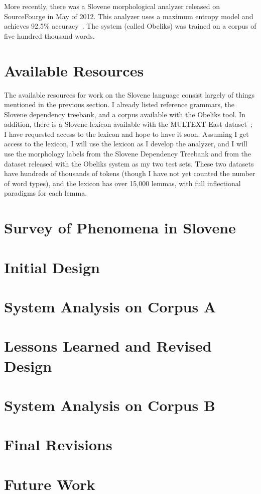 \documentclass[11pt,letterpaper]{article}
\begin{document}
More recently, there was a Slovene morphological analyzer released on
SourceFourge in May of 2012.  This analyzer uses a maximum entropy model and
achieves 92.5\% accuracy~\citep{grcar-2012-obeliks}.  The system (called
Obeliks) was trained on a corpus of five hundred thousand words.

\section{Available Resources}

The available resources for work on the Slovene language consist largely of
things mentioned in the previous section.  I already listed reference grammars,
the Slovene dependency treebank, and a corpus available with the Obeliks tool.
In addition, there is a Slovene lexicon available with the MULTEXT-East
dataset~\citep{erjavec-1998-slovene-lexicon}; I have requested access to the
lexicon and hope to have it soon.  Assuming I get access to the lexicon, I will
use the lexicon as I develop the analyzer, and I will use the morphology labels
from the Slovene Dependency Treebank and from the dataset released with the
Obeliks system as my two test sets.  These two datasets have hundreds of
thousands of tokens (though I have not yet counted the number of word types),
and the lexicon has over 15,000 lemmas, with full inflectional paradigms for
each lemma.

\section{Survey of Phenomena in Slovene}

\section{Initial Design}

\section{System Analysis on Corpus A}

\section{Lessons Learned and Revised Design}

\section{System Analysis on Corpus B}

\section{Final Revisions}

\section{Future Work}







\label{lastpage}
\end{document}
